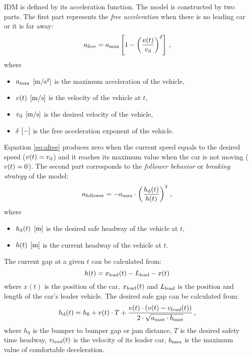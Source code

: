 		IDM is defined by its acceleration function. The model is constructed by two parts. The first part represents the \textit{free acceleration} when there is no leading car or it is far away:
		\begin{equation}
			a_{\rm free}=a_{\rm max}\left [ 1 - \left ( \frac{v(t)}{{v_{\rm d}}} \right )^{\delta} \right ]\,,
			\label{eq:afree}
		\end{equation}
		where
		\begin{itemize}
			\item $a_{\rm max}$ $\rm [m/s^2]$ is the maximum acceleration of the vehicle,
			\item $v(t)$ $\rm [m/s]$ is the velocity of the vehicle at $t$,
			\item ${v_{\rm d}}$ $\rm [m/s]$ is the desired velocity of the vehicle,
			\item $\delta$ $\rm [-]$ is the free acceleration exponent of the vehicle.
		\end{itemize}
		Equation \ref{eq:afree} produces zero when the current speed equals to the desired speed ($v(t)={v_{\rm d}}$) and it reaches its maximum value when the car is not moving ($v(t)=0$).
		The second part corresponds to the \textit{follower behavior} or \textit{breaking strategy} of the model:
		\begin{equation}
			a_{\rm follower}=-a_{\rm max}\cdot \left ( \frac{h_{\rm d}(t)}{h(t)} \right )^2\,,
			\label{eq:afollower}
		\end{equation}
		where
		\begin{itemize}
			\item $h_{\rm d}(t)$ $\rm [m]$ is the desired safe headway of the vehicle at $t$,
			\item $h(t)$ $\rm [m]$ is the current headway of the vehicle at $t$.
		\end{itemize}
		The current gap at a given $t$ can be calculated from:
		\begin{equation}
			h(t)=x_{\rm lead}(t)-L_{\rm lead}- x(t)
		\end{equation}
		where $x(t)$ is the position of the car, $x_{\rm lead}(t)$ and $L_{\rm lead}$ is the position and length of the  car's leader vehicle.
		The desired safe gap can be calculated from:
		\begin{equation}
			h_{\rm d}(t)=h_0 + v(t)\cdot T + \frac{v(t)\cdot(v(t)-v_{lead}(t))}{2\cdot \sqrt{a_{\rm max}\cdot b_{\rm max}}}\,,
		\end{equation}
		where $h_0$ is the bumper to bumper gap or jam distance, $T$ is the desired safety time headway, $v_{lead}(t)$ is the velocity of its leader car, $b_{\rm max}$ is the maximum value of comfortable deceleration.
